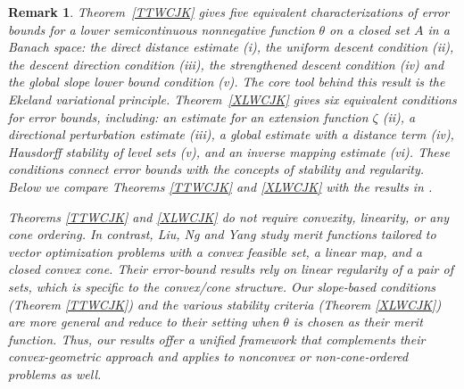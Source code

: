 \documentclass[11pt]{article}
\newtheorem{remark}{Remark}[section]
\begin{document}
\begin{remark}   		 
	Theorem~\ref{TTWCJK} gives five equivalent characterizations of error bounds for a lower semicontinuous nonnegative function $\theta$ on a closed set $A$ in a Banach space: the direct distance estimate (i), the uniform descent condition (ii), the descent direction condition (iii),    the strengthened descent    condition (iv)  and the global slope lower bound condition (v). The core tool behind this result is the Ekeland variational principle.
	Theorem~\ref{XLWCJK} gives six equivalent conditions for error bounds, including: an estimate for an extension function $\zeta$ (ii), a directional perturbation estimate (iii), a global estimate with a distance term (iv), Hausdorff stability of level sets (v), and an inverse mapping estimate (vi). These conditions connect error bounds with the concepts of  stability  and  regularity.  Below we compare Theorems \ref{TTWCJK} and \ref{XLWCJK} with the results in   \cite{LiuNgYang2009, NgZheng, KL1999, NgYang2002, AC2004, Kruger, KLT2018}.
	
	
	Theorems \ref{TTWCJK} and \ref{XLWCJK}  do not require convexity, linearity, or any cone ordering. In contrast, Liu, Ng and Yang \cite{LiuNgYang2009} study merit functions tailored to vector optimization problems with a convex feasible set, a linear map, and a closed convex cone. Their error‐bound results rely on linear regularity of a pair of sets, which is specific to the convex/cone structure.
	Our slope‐based conditions (Theorem \ref{TTWCJK}) and the various stability criteria (Theorem \ref{XLWCJK}) are more general and reduce to their setting when \(\theta\) is chosen as their merit function.  Thus, our results offer a unified framework that complements their convex‐geometric approach and applies to nonconvex or non‐cone‐ordered problems as well.
	
	
	
	
	

\end{remark}
\end{document}
